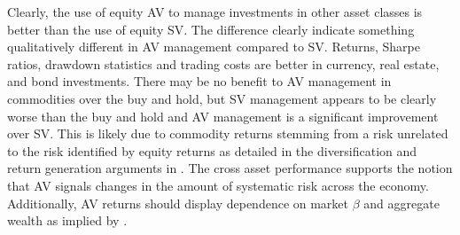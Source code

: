 Clearly, the use of equity AV to manage investments in other asset classes is better than the use of equity SV. The difference clearly indicate something qualitatively different in AV management compared to SV. Returns, Sharpe ratios, drawdown statistics and trading costs are better in currency, real estate, and bond investments. There may be no benefit to AV management in commodities over the buy and hold, but SV management appears to be clearly worse than the buy and hold and AV management is a significant improvement over SV. This is likely due to commodity returns stemming from a risk unrelated to the risk identified by equity returns as detailed in the diversification and return generation arguments in \citet{gorton_facts_2006,buyuksahin_commodities_2008,NBERw21243,erb_conquering_nodate}. %
The cross asset performance supports the notion that AV signals changes in the amount of systematic risk across the economy. Additionally, AV returns should display dependence on market $\beta$ and aggregate wealth as implied by \citet{pollet_average_2010}.